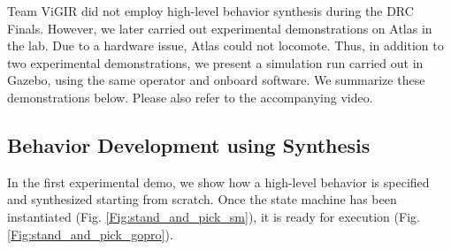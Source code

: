 

Team ViGIR did not employ high-level behavior synthesis during the DRC Finals.
However, we later carried out experimental demonstrations on Atlas in the lab.
Due to a hardware issue, Atlas could not locomote.
Thus, in addition to two experimental demonstrations, we present a simulation run carried out in Gazebo, using the same operator and onboard software.
We summarize these demonstrations below.
Please also refer to the accompanying video.

\subsection{Behavior Development using Synthesis}\label{S:SynthesisFromScratch}

In the first experimental demo, we show how a high-level behavior is specified and synthesized starting from scratch.
Once the state machine has been instantiated (Fig. \ref{Fig:stand_and_pick_sm}), it is ready for execution (Fig. \ref{Fig:stand_and_pick_gopro}).

